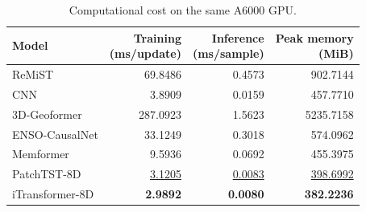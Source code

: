 \begin{table}[!t]
\centering\footnotesize
\caption{Computational cost on the same A6000 GPU.}
\label{tab:efficiency}
\begin{tabular}{lrrr}
\toprule
Model & \shortstack{Training\\(ms/update)} & \shortstack{Inference\\(ms/sample)} & \shortstack{Peak memory\\(MiB)} \\
\midrule
ReMiST & 69.8486 & 0.4573 & 902.7144 \\
CNN & 3.8909 & 0.0159 & 457.7710 \\
3D-Geoformer & 287.0923 & 1.5623 & 5235.7158 \\
ENSO-CausalNet & 33.1249 & 0.3018 & 574.0962 \\
Memformer & 9.5936 & 0.0692 & 455.3975 \\
PatchTST-8D & \underline{3.1205} & \underline{0.0083} & \underline{398.6992} \\
iTransformer-8D & \textbf{2.9892} & \textbf{0.0080} & \textbf{382.2236} \\
\bottomrule
\end{tabular}
\end{table}
